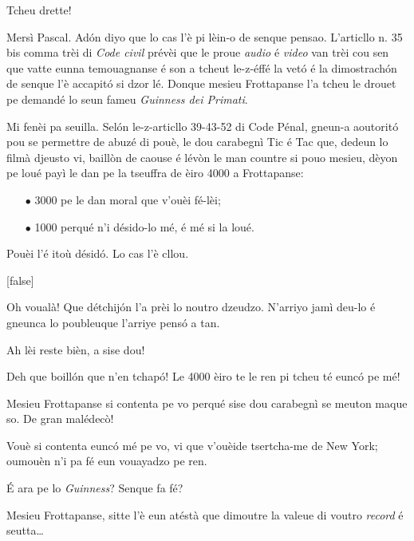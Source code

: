 \begin{drama}
\Pascalspeaks Tcheu drette!


\DzeudzoSenliquerspeaks Mersì Pascal. Adón diyo que lo cas l'è pi lèin-o de senque pensao. L'articllo n. 35 bis comma trèi di \textit{Code civil} prévèi que le proue \textit{audio} é \textit{video} van trèi cou sen que vatte eunna temouagnanse é son a tcheut le-z-éffé la vetó é la dimostrachón de senque l’è accapitó si dzor lé. Donque mesieu Frottapanse l'a tcheu le drouet pe demandé lo seun fameu \textit{Guinness dei Primati}.


\DzeudzoSenliquerspeaks Mi fenèi pa seuilla. Selón le-z-articllo 39-43-52 di Code Pénal, gneun-a aoutoritó pou se permettre de abuzé di pouè, le dou carabegnì Tic é Tac que, dedeun lo filmà djeusto vi, baillòn de caouse é lévòn le man countre si pouo mesieu, dèyon pe loué payì le dan pe la tseuffra de èiro 4000 a Frottapanse: 
\begin{itemize}
\item[$\bullet$] 3000 pe le dan moral que v'ouèi fé-lèi;
\item[$\bullet$] 1000 perqué n’i désido-lo mé, é mé si la loué.
\end{itemize}
Pouèi l'é itoù désidó. Lo cas l'è cllou.

[false]


\Ritaspeaks Oh voualà! Que détchijón l’a prèi lo noutro dzeudzo. N'arriyo jamì deu-lo é gneunca lo poubleuque l'arriye pensó a tan.

\Cienspeaks Ah lèi reste bièn, a sise dou!

\Ticspeaks{} Deh que boillón que n'en tchapó! Le 4000 èiro te le ren pi tcheu té eunc\'o pe mé!

\Ritaspeaks Mesieu Frottapanse si contenta pe vo perqué sise dou carabegnì se meuton maque so. De gran malédec\`o!

\Tissotspeaks Vouè si contenta eunc\'o mé pe vo, vi que v'ouèide tsertcha-me de New York; oumouèn n’i pa fé eun vouayadzo pe ren.

\Cienspeaks É ara pe lo \textit{Guinness}? Senque fa fé?

\Tissotspeaks Mesieu Frottapanse, sitte l’è eun atéstà que dimoutre la valeue di voutro \textit{record} é seutta\ldots


\end{drama}

